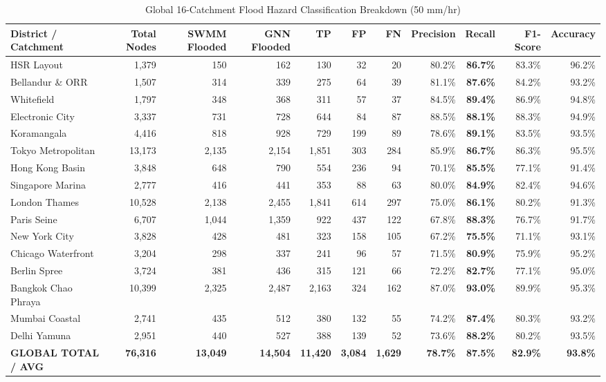 \documentclass[conference]{IEEEtran}
\begin{document}
\begin{table}[t]
\caption{Global 16-Catchment Flood Hazard Classification Breakdown (50 mm/hr)}
\label{tab:global_classification}
\centering
\small
\begin{tabular}{lrrrrrrrrrr}
\toprule
\textbf{District / Catchment} & \textbf{Total Nodes} & \textbf{SWMM Flooded} & \textbf{GNN Flooded} & \textbf{TP} & \textbf{FP} & \textbf{FN} & \textbf{Precision} & \textbf{Recall} & \textbf{F1-Score} & \textbf{Accuracy} \\
\midrule
HSR Layout & 1,379 & 150 & 162 & 130 & 32 & 20 & 80.2\% & \textbf{86.7\%} & 83.3\% & 96.2\% \\
Bellandur \& ORR & 1,507 & 314 & 339 & 275 & 64 & 39 & 81.1\% & \textbf{87.6\%} & 84.2\% & 93.2\% \\
Whitefield & 1,797 & 348 & 368 & 311 & 57 & 37 & 84.5\% & \textbf{89.4\%} & 86.9\% & 94.8\% \\
Electronic City & 3,337 & 731 & 728 & 644 & 84 & 87 & 88.5\% & \textbf{88.1\%} & 88.3\% & 94.9\% \\
Koramangala & 4,416 & 818 & 928 & 729 & 199 & 89 & 78.6\% & \textbf{89.1\%} & 83.5\% & 93.5\% \\
Tokyo Metropolitan & 13,173 & 2,135 & 2,154 & 1,851 & 303 & 284 & 85.9\% & \textbf{86.7\%} & 86.3\% & 95.5\% \\
Hong Kong Basin & 3,848 & 648 & 790 & 554 & 236 & 94 & 70.1\% & \textbf{85.5\%} & 77.1\% & 91.4\% \\
Singapore Marina & 2,777 & 416 & 441 & 353 & 88 & 63 & 80.0\% & \textbf{84.9\%} & 82.4\% & 94.6\% \\
London Thames & 10,528 & 2,138 & 2,455 & 1,841 & 614 & 297 & 75.0\% & \textbf{86.1\%} & 80.2\% & 91.3\% \\
Paris Seine & 6,707 & 1,044 & 1,359 & 922 & 437 & 122 & 67.8\% & \textbf{88.3\%} & 76.7\% & 91.7\% \\
New York City & 3,828 & 428 & 481 & 323 & 158 & 105 & 67.2\% & \textbf{75.5\%} & 71.1\% & 93.1\% \\
Chicago Waterfront & 3,204 & 298 & 337 & 241 & 96 & 57 & 71.5\% & \textbf{80.9\%} & 75.9\% & 95.2\% \\
Berlin Spree & 3,724 & 381 & 436 & 315 & 121 & 66 & 72.2\% & \textbf{82.7\%} & 77.1\% & 95.0\% \\
Bangkok Chao Phraya & 10,399 & 2,325 & 2,487 & 2,163 & 324 & 162 & 87.0\% & \textbf{93.0\%} & 89.9\% & 95.3\% \\
Mumbai Coastal & 2,741 & 435 & 512 & 380 & 132 & 55 & 74.2\% & \textbf{87.4\%} & 80.3\% & 93.2\% \\
Delhi Yamuna & 2,951 & 440 & 527 & 388 & 139 & 52 & 73.6\% & \textbf{88.2\%} & 80.2\% & 93.5\% \\
\midrule
\textbf{GLOBAL TOTAL / AVG} & \textbf{76,316} & \textbf{13,049} & \textbf{14,504} & \textbf{11,420} & \textbf{3,084} & \textbf{1,629} & \textbf{78.7\%} & \textbf{87.5\%} & \textbf{82.9\%} & \textbf{93.8\%} \\
\bottomrule
\end{tabular}
\end{table}
\end{document}
